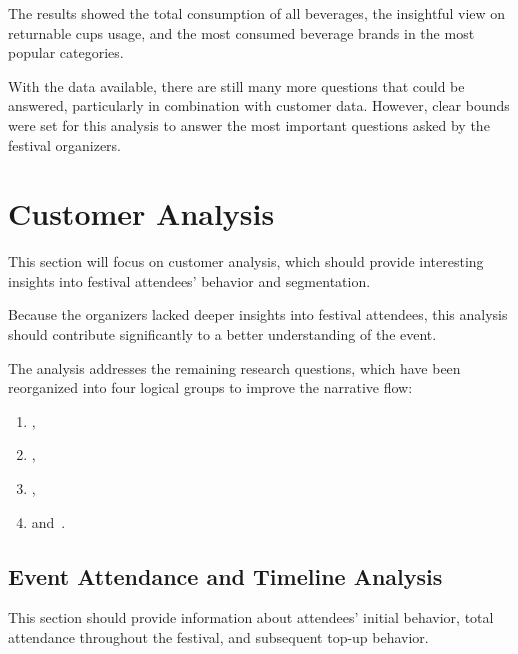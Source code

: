 The results showed the total consumption of all beverages, the insightful view on returnable cups usage, and the most consumed beverage brands in the most popular categories.

With the data available, there are still many more questions that could be answered, particularly in combination with customer data.
However, clear bounds were set for this analysis to answer the most important questions asked by the festival organizers.



\section{Customer Analysis}
\label{sec:analysis-customers}

This section will focus on customer analysis, which should provide interesting insights into festival attendees' behavior and segmentation.

Because the organizers lacked deeper insights into festival attendees, this analysis should contribute significantly to a better understanding of the event.

The analysis addresses the remaining research questions, which have been reorganized into four logical groups to improve the narrative flow:
\begin{enumerate}
	\item {},
	\item {},
	\item {},
	\item and~.
\end{enumerate}


\subsection{Event Attendance and Timeline Analysis}
\label{subsec:analysis-customer-event-attendance-timeline}

This section should provide information about attendees' initial behavior, total attendance throughout the festival, and subsequent top-up behavior.

